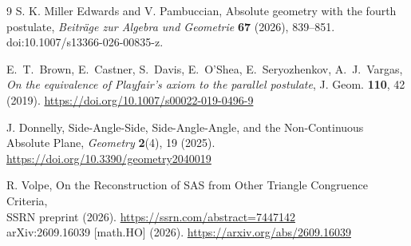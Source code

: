 \documentclass[11pt,a4paper]{article}
\theoremstyle{definition}
\theoremstyle{remark}
\numberwithin{equation}{section}
\begin{document}
\begin{thebibliography}{9}
S. K. Miller Edwards and V. Pambuccian,
Absolute geometry with the fourth postulate,
\textit{Beitr\"age zur Algebra und Geometrie} \textbf{67} (2026), 839--851.
doi:10.1007/s13366-026-00835-z.

E.~T.~Brown, E.~Castner, S.~Davis, E.~O'Shea, E.~Seryozhenkov, A.~J.~Vargas,
\emph{On the equivalence of Playfair's axiom to the parallel postulate},
J. Geom. \textbf{110}, 42 (2019).
\url{https://doi.org/10.1007/s00022-019-0496-9}

J. Donnelly,
Side-Angle-Side, Side-Angle-Angle, and the Non-Continuous Absolute Plane,
\textit{Geometry} \textbf{2}(4), 19 (2025).
\url{https://doi.org/10.3390/geometry2040019}

R. Volpe,
On the Reconstruction of SAS from Other Triangle Congruence Criteria,\\
SSRN preprint (2026).
\url{https://ssrn.com/abstract=7447142}\\
arXiv:2609.16039 [math.HO] (2026).
\url{https://arxiv.org/abs/2609.16039}
\end{thebibliography}
\end{document}
